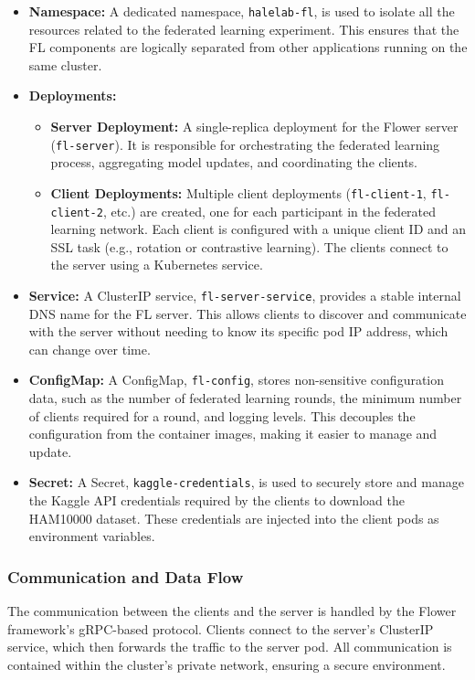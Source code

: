 \documentclass[a4paper, 10 pt, conference]{ieeeconf}
\begin{document}
\begin{itemize}
    \item \textbf{Namespace:} A dedicated namespace, \texttt{halelab-fl}, is used to isolate all the resources related to the federated learning experiment. This ensures that the FL components are logically separated from other applications running on the same cluster.

    \item \textbf{Deployments:}
    \begin{itemize}
        \item \textbf{Server Deployment:} A single-replica deployment for the Flower server (\texttt{fl-server}). It is responsible for orchestrating the federated learning process, aggregating model updates, and coordinating the clients.
        \item \textbf{Client Deployments:} Multiple client deployments (\texttt{fl-client-1}, \texttt{fl-client-2}, etc.) are created, one for each participant in the federated learning network. Each client is configured with a unique client ID and an SSL task (e.g., rotation or contrastive learning). The clients connect to the server using a Kubernetes service.
    \end{itemize}

    \item \textbf{Service:} A ClusterIP service, \texttt{fl-server-service}, provides a stable internal DNS name for the FL server. This allows clients to discover and communicate with the server without needing to know its specific pod IP address, which can change over time.

    \item \textbf{ConfigMap:} A ConfigMap, \texttt{fl-config}, stores non-sensitive configuration data, such as the number of federated learning rounds, the minimum number of clients required for a round, and logging levels. This decouples the configuration from the container images, making it easier to manage and update.

    \item \textbf{Secret:} A Secret, \texttt{kaggle-credentials}, is used to securely store and manage the Kaggle API credentials required by the clients to download the HAM10000 dataset. These credentials are injected into the client pods as environment variables.
\end{itemize}

\subsubsection{Communication and Data Flow}
The communication between the clients and the server is handled by the Flower framework's gRPC-based protocol. Clients connect to the server's ClusterIP service, which then forwards the traffic to the server pod. All communication is contained within the cluster's private network, ensuring a secure environment.
\end{document}
